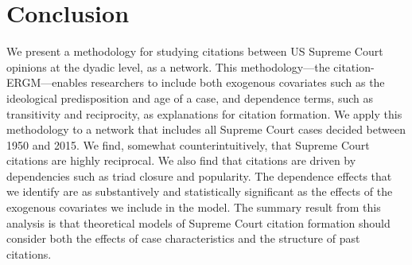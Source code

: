\documentclass{cup-pan}
\begin{document}
\section{Conclusion}

We present a methodology for studying citations between US Supreme Court opinions at the dyadic level, as a network. This methodology---the citation-ERGM---enables researchers to include both exogenous covariates such as the ideological predisposition and age of a case, and dependence terms, such as transitivity and reciprocity, as explanations for citation formation. We apply this methodology to a network that includes all Supreme Court cases decided between 1950 and 2015. We find, somewhat counterintuitively, that Supreme Court citations are highly reciprocal. We also find that citations are driven by dependencies such as triad closure and popularity. The dependence effects that we identify are as substantively and statistically significant as the effects of the exogenous covariates we include in the model. The summary result from this analysis is that theoretical models of Supreme Court citation formation should consider both the effects of case characteristics and the structure of past citations. 


\printbibliography
\end{document}
